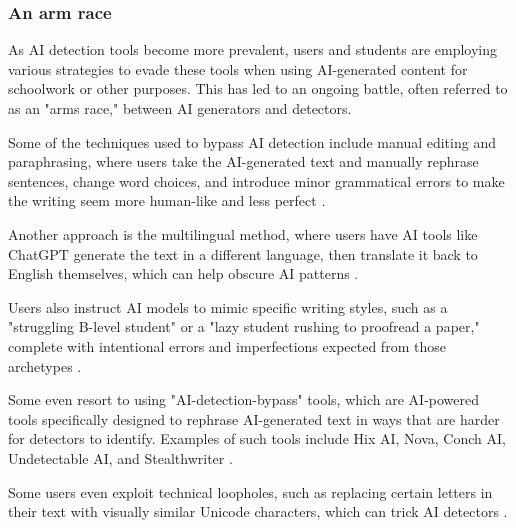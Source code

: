 \documentclass{article}
\begin{document}
\subsubsection{An arm race}
As AI detection tools become more prevalent, users and students are employing various strategies to evade
these tools when using AI-generated content for schoolwork or other purposes. This has led to an ongoing
battle, often referred to as an "arms race," between AI generators and detectors.

Some of the techniques used to bypass AI detection include manual editing and paraphrasing, where users
take the AI-generated text and manually rephrase sentences, change word choices, and introduce minor
grammatical errors to make the writing seem more human-like and less perfect \cite{https://www.reddit.com/r/ChatGPT/comments/139wvn7/how_to_avoid_ai_detection/}
\cite{https://www.reddit.com/r/ChatGPT/comments/18f0u56/to_fool_an_ai_detector/}.

Another approach is the multilingual method, where users have AI tools like ChatGPT generate the text in a different language,
then translate it back to English themselves, which can help obscure AI patterns
\cite{https://www.reddit.com/r/ChatGPT/comments/100jw27/how_you_can_bypass_ai_detection/}.

Users also instruct AI models to mimic specific writing styles, such as a "struggling B-level student"
or a "lazy student rushing to proofread a paper," complete with intentional errors and imperfections
expected from those archetypes \cite{https://www.reddit.com/r/ChatGPTPromptGenius/comments/162anql/is_there_any_free_method_to_bypass_ai_detection/}
\cite{https://www.reddit.com/r/ChatGPT/comments/18f0u56/to_fool_an_ai_detector/}.

Some even resort to using "AI-detection-bypass" tools, which are AI-powered tools specifically designed
to rephrase AI-generated text in ways that are harder for detectors to identify. Examples of such tools
include Hix AI, Nova, Conch AI, Undetectable AI, and Stealthwriter
\cite{https://www.reddit.com/r/ChatGPT/comments/139wvn7/how_to_avoid_ai_detection/}
\cite{https://www.reddit.com/r/ChatGPTPromptGenius/comments/162anql/is_there_any_free_method_to_bypass_ai_detection/}
\cite{https://www.reddit.com/r/OpenAI/comments/zmglvv/how_to_outsmart_and_bypass_ai_content_detection/}.

Some users even exploit technical loopholes, such as replacing certain letters in their text with visually
similar Unicode characters, which can trick AI detectors
\cite{https://www.reddit.com/r/OpenAI/comments/122wlot/the_best_way_to_bypass_ai_detectors/}.
\end{document}

